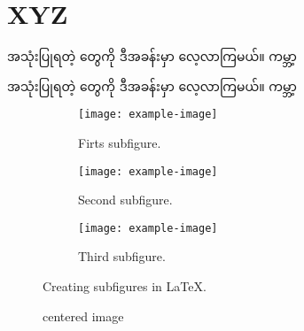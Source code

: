 \chapter{XYZ}
\begin{sloppypar}
    အသုံးပြုရတဲ့  \color{tungsten} တွေကို  ဒီအခန်းမှာ ‌လေ့လာကြမယ်။ ကမ္ဘာ့

    အသုံးပြုရတဲ့  \color{tungsten} တွေကို  ဒီအခန်းမှာ ‌လေ့လာကြမယ်။ ကမ္ဘာ့

\end{sloppypar}



\begin{figure}
\centering
\begin{subfigure}{0.4\textwidth}
    \texttt{[image: example-image]}
    \caption{Firts subfigure.}
    \label{fig:first}
\end{subfigure}
\hfill
\begin{subfigure}{0.4\textwidth}
    \texttt{[image: example-image]}
    \caption{Second subfigure.}
    \label{fig:second}
\end{subfigure}
\hfill
\begin{subfigure}{0.4\textwidth}
    \texttt{[image: example-image]}
    \caption{Third subfigure.}
    \label{fig:third}
\end{subfigure}
        
\caption{Creating subfigures in \LaTeX.}
\label{fig:figures}
\end{figure}

\begin{figure}
    \caption{centered image}
\end{figure}

\noindent{}

\afterpage{\blankpage}
